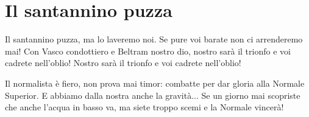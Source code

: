 \section{Il santannino puzza}
\begin{canzone}
Il santannino puzza,
ma lo laveremo noi.
Se pure voi barate
non ci arrenderemo mai!
Con Vasco condottiero
e Beltram nostro dio,
nostro sarà il trionfo
e voi cadrete nell’oblio!
Nostro sarà il trionfo
e voi cadrete nell’oblio!

Il normalista è fiero,
non prova mai timor:
combatte per dar gloria
alla Normale Superior.
E abbiamo dalla nostra
anche la gravità...
Se un giorno mai scopriste
che anche l'acqua in basso va,
ma siete troppo scemi
e la Normale vincerà!
\end{canzone}
